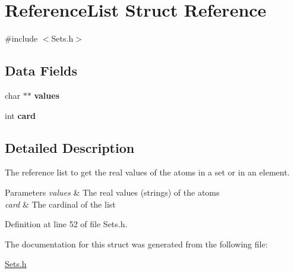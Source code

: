 \hypertarget{struct_reference_list}{
\section{ReferenceList Struct Reference}
\label{struct_reference_list}
}


{\ttfamily \#include $<$Sets.h$>$}

\subsection*{Data Fields}
\begin{DoxyCompactItemize}
\item 
\hypertarget{struct_reference_list_ada2188333c6f540ad9cbe7c0e17003db}{
char $\ast$$\ast$ {\bfseries values}}
\label{struct_reference_list_ada2188333c6f540ad9cbe7c0e17003db}

\item 
\hypertarget{struct_reference_list_acd789e381a684163a021e2d228653afd}{
int {\bfseries card}}
\label{struct_reference_list_acd789e381a684163a021e2d228653afd}

\end{DoxyCompactItemize}


\subsection{Detailed Description}
The reference list to get the real values of the atoms in a set or in an element. 
\begin{DoxyParams}{Parameters}
{\em values} & The real values (strings) of the atoms \\
\hline
{\em card} & The cardinal of the list \\
\hline
\end{DoxyParams}


Definition at line 52 of file Sets.h.



The documentation for this struct was generated from the following file:\begin{DoxyCompactItemize}
\item 
\hyperlink{_sets_8h}{Sets.h}\end{DoxyCompactItemize}
